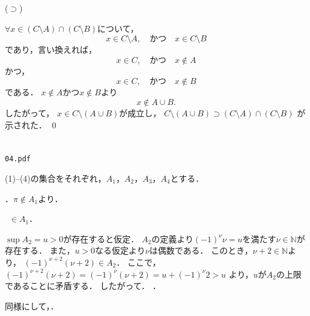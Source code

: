 \documentclass[uplatex,11pt]{jsarticle}
\def\shoumon#1{\vspace{1em}\noindent\ovalbox{\textsf{ #1 }}}
\begin{document}
($\supset$)

$\forall x \in (C \setminus A) \cap (C \setminus B)$について，
\begin{equation*}
	x \in  C \setminus A,
	\quad \text{かつ} \quad
	x \in C \setminus B
\end{equation*}
であり，言い換えれば，
\begin{equation*}
	x \in  C,
	\quad \text{かつ} \quad
	x \not\in A
\end{equation*}
かつ，
\begin{equation*}
	x \in  C,
	\quad \text{かつ} \quad
	x \not\in B
\end{equation*}
である．
$x \not\in A$かつ$x \not\in B$より
\begin{equation*}
	x \not\in A \cup B.
\end{equation*}
したがって，
$x \in C \setminus (A \cup B)$が成立し，
$C \setminus (A \cup B) \supset (C \setminus A) \cap (C \setminus B)$
が示された．
\qed

\newpage
\section{}

\begin{shadebox}
	\begin{center}
		\texttt{04.pdf}
	\end{center}
\end{shadebox}
\vspace{5mm}

(1)--(4)の集合をそれぞれ，$A_1$，$A_2$，$A_3$，$A_4$とする．

\shoumon{(1)}

．$\pi \not\in A_1$より．

\ $\in A_1$．

\shoumon{(2)}

$\sup A_2 = u > 0$が存在すると仮定．
$A_2$の定義より$(-1)^\nu \nu = u$を満たす$\nu \in \mathbb{N}$が存在する．
また，$u > 0$なる仮定より$\nu$は偶数である．
このとき，$\nu + 2 \in \mathbb{N}$より，
$(-1)^{\nu + 2} (\nu + 2) \in A_2$．
ここで，
$(-1)^{\nu + 2} (\nu + 2) = (-1)^{\nu} (\nu + 2) = u + (-1)^{\nu}2 > u$
より，$u$が$A_2$の上限であることに矛盾する．
したがって．
．

同様にして，．
\end{document}
